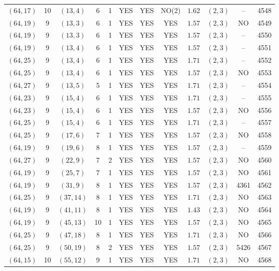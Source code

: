 \begin{longtable}{|c|c|c|c|c|c|c|c|c|c|c|c|}
$(64,17)$ & 10 & $(13,4)$ & 6 & 1 & YES & YES & NO(2) & $1.62$ & $(2,3)$ & -- & 4548\\
$(64,19)$ & 9 & $(13,3)$ & 6 & 1 & YES & YES & YES & $1.57$ & $(2,3)$ & NO & 4549\\
$(64,19)$ & 9 & $(13,3)$ & 6 & 1 & YES & YES & YES & $1.57$ & $(2,3)$ & -- & 4550\\
$(64,19)$ & 9 & $(13,4)$ & 6 & 1 & YES & YES & YES & $1.57$ & $(2,3)$ & -- & 4551\\
$(64,25)$ & 9 & $(13,4)$ & 6 & 1 & YES & YES & YES & $1.71$ & $(2,3)$ & -- & 4552\\
$(64,25)$ & 9 & $(13,4)$ & 6 & 1 & YES & YES & YES & $1.57$ & $(2,3)$ & NO & 4553\\
$(64,27)$ & 9 & $(13,5)$ & 5 & 1 & YES & YES & YES & $1.71$ & $(2,3)$ & -- & 4554\\
$(64,23)$ & 9 & $(15,4)$ & 6 & 1 & YES & YES & YES & $1.71$ & $(2,3)$ & -- & 4555\\
$(64,23)$ & 9 & $(15,4)$ & 6 & 1 & YES & YES & YES & $1.57$ & $(2,3)$ & NO & 4556\\
$(64,25)$ & 9 & $(15,4)$ & 6 & 1 & YES & YES & YES & $1.71$ & $(2,3)$ & -- & 4557\\
$(64,25)$ & 9 & $(17,6)$ & 7 & 1 & YES & YES & YES & $1.57$ & $(2,3)$ & NO & 4558\\
$(64,19)$ & 9 & $(19,6)$ & 8 & 1 & YES & YES & YES & $1.57$ & $(2,3)$ & -- & 4559\\
$(64,27)$ & 9 & $(22,9)$ & 7 & 2 & YES & YES & YES & $1.57$ & $(2,3)$ & NO & 4560\\
$(64,19)$ & 9 & $(25,7)$ & 7 & 1 & YES & YES & YES & $1.57$ & $(2,3)$ & NO & 4561\\
$(64,19)$ & 9 & $(31,9)$ & 8 & 1 & YES & YES & YES & $1.57$ & $(2,3)$ & 4361 & 4562\\
$(64,25)$ & 9 & $(37,14)$ & 8 & 1 & YES & YES & YES & $1.71$ & $(2,3)$ & NO & 4563\\
$(64,19)$ & 9 & $(41,11)$ & 8 & 1 & YES & YES & YES & $1.43$ & $(2,3)$ & NO & 4564\\
$(64,19)$ & 9 & $(45,13)$ & 10 & 1 & YES & YES & YES & $1.57$ & $(2,3)$ & NO & 4565\\
$(64,25)$ & 9 & $(47,18)$ & 8 & 1 & YES & YES & YES & $1.71$ & $(2,3)$ & NO & 4566\\
$(64,25)$ & 9 & $(50,19)$ & 8 & 2 & YES & YES & YES & $1.57$ & $(2,3)$ & 5426 & 4567\\
$(64,15)$ & 10 & $(55,12)$ & 9 & 1 & YES & YES & YES & $1.71$ & $(2,3)$ & NO & 4568\\

\end{longtable}
